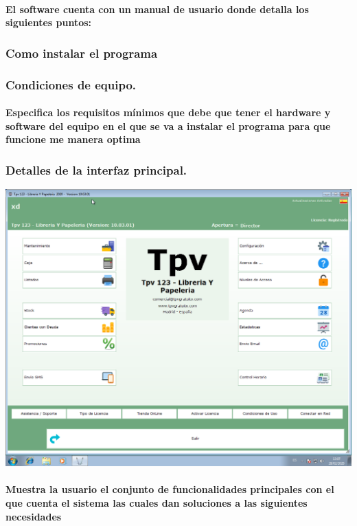 \documentclass[12pt,a4paper]{article}
\begin{document}
\paragraph{El software cuenta con un manual de usuario donde detalla los siguientes puntos:}
\subsubsection*{Como instalar el programa}
\subsubsection*{Condiciones de equipo.}
\paragraph{Especifica los requisitos mínimos que debe que tener el hardware y software del equipo en el que se va a instalar el programa para que funcione me manera optima}
\subsubsection*{Detalles de la interfaz principal.}
\includegraphics[scale=0.35]{tpv.png} 
\paragraph{Muestra la usuario el conjunto de funcionalidades principales con el que cuenta el sistema las cuales dan soluciones a las siguientes necesidades}
\end{document}
